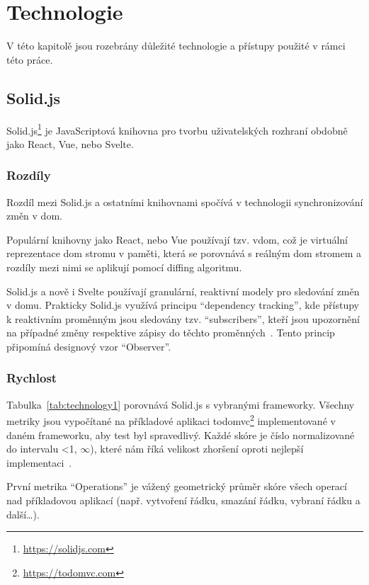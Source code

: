\chapter{Technologie}

V této kapitolě jsou rozebrány důležité technologie a přístupy použité v rámci této práce.

\section{Solid.js}

Solid.js\footnote{\url{https://solidjs.com}} je JavaScriptová knihovna pro tvorbu uživatelských rozhraní obdobně jako React, Vue, nebo Svelte.


\subsection{Rozdíly}

Rozdíl mezi Solid.js a ostatními knihovnami spočívá v technologii synchronizování změn v \gls{dom}.

Populární knihovny jako React, nebo Vue používají tzv. \gls{vdom}, což je virtuální reprezentace \gls{dom} stromu v paměti, která se porovnává s reálným \gls{dom} stromem a rozdíly mezi nimi se aplikují pomocí diffing algoritmu.

Solid.js a nově i Svelte používají granulární, reaktivní modely pro sledování změn v domu.
Prakticky Solid.js využívá principu “dependency tracking”, kde přístupy k reaktivním proměnným jsou sledovány tzv. “subscribers”, kteří jsou upozornění na případné změny respektive zápisy do těchto proměnných~\cite{solid-reactivity}.
Tento princip připomíná designový vzor “Observer”.

\subsection{Rychlost}

Tabulka~\ref{tab:technology1} porovnává Solid.js s vybranými frameworky.
Všechny metriky jsou vypočítané na příkladové aplikaci \gls{todomvc}\footnote{\url{https://todomvc.com}} implementované v daném frameworku, aby test byl spravedlivý.
Každé skóre je číslo normalizované do intervalu <1, $\infty$), které nám říká velikost zhoršení oproti nejlepší implementaci~\cite{krausest120,krausest122}.

První metrika ``Operations'' je vážený geometrický průměr skóre všech operací nad příkladovou aplikací (např. vytvoření řádku, smazání řádku, vybraní řádku a další\dots).

